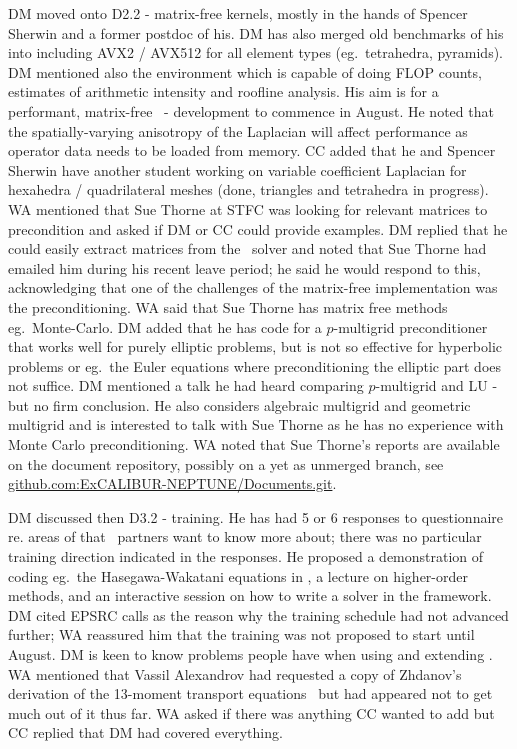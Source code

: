 DM moved onto D2.2 - matrix-free kernels, mostly in the hands of Spencer 
Sherwin and a former postdoc of his.  DM has also merged old 
benchmarks of his into  including AVX2 / AVX512 for all element 
types (eg.\ tetrahedra, pyramids).  DM mentioned also the   
environment which is capable of doing FLOP counts, estimates of arithmetic 
intensity and roofline analysis.  His aim is for a performant, matrix-free 
\papp\ - development to commence in August.  He noted that the 
spatially-varying anisotropy of the Laplacian will affect performance as 
operator data needs to be loaded from memory.  CC added that he and Spencer 
Sherwin have another student working on variable coefficient Laplacian for 
hexahedra / quadrilateral meshes (done, triangles and tetrahedra in progress).  
WA mentioned that Sue Thorne at STFC was looking for relevant matrices to 
precondition and asked if DM or CC could provide examples.  DM replied that he 
could easily extract matrices from the \papp\ solver and noted that Sue 
Thorne had emailed him during his recent leave period; he said he would respond 
to this, acknowledging that one of the challenges of the matrix-free 
implementation was the preconditioning.  WA said that Sue Thorne has matrix 
free methods eg.\ Monte-Carlo.  DM added that he has code for a $p$-multigrid 
preconditioner that works well for purely elliptic problems, but is not so 
effective for hyperbolic problems or eg.\ the Euler equations where 
preconditioning the elliptic part does not suffice.  DM mentioned a talk
he had heard comparing $p$-multigrid and LU - but no firm conclusion.  He also 
considers algebraic multigrid and geometric multigrid and is interested to 
talk with Sue Thorne as he has no experience with Monte Carlo preconditioning.  
WA noted that Sue Thorne's reports are available on the document repository,
possibly on a yet as unmerged branch, see \url{github.com:ExCALIBUR-NEPTUNE/Documents.git}.

DM discussed then D3.2 - training.  He has had 5 or 6 responses to 
questionnaire re. areas of  that \nep\  partners want to know more 
about; there was no particular training direction indicated in the responses.  
He proposed a demonstration of coding eg.\ the Hasegawa-Wakatani equations in 
, a lecture on higher-order methods, and an interactive session on 
how to write a solver in the framework.  DM cited EPSRC calls as the reason why 
the training schedule had not advanced further; WA reassured him that the 
training was not proposed to start until August.  DM is keen to know problems people 
have when using and extending .  WA mentioned that Vassil 
Alexandrov had requested a copy of Zhdanov's derivation of the 13-moment transport
equations~\cite{zhdanov} but had appeared not 
to get much out of it thus far.  WA asked if there was anything CC wanted to 
add but CC replied that DM had covered everything.


